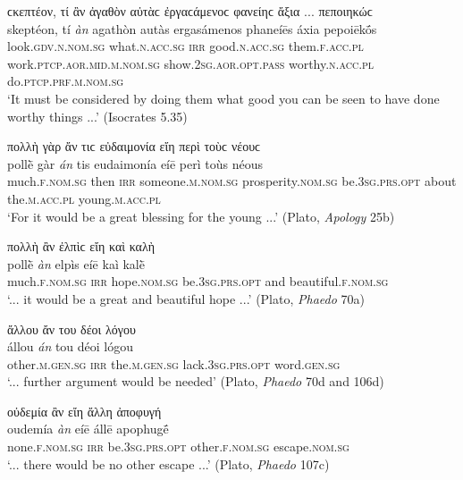 \begin{exe}
\ex ϲκεπτέον, τί ἂν ἀγαθὸν αὐτὰϲ ἐργαϲάμενοϲ φανείηϲ ἄξια ... πεποιηκώϲ\\
\gll skeptéon, tí \emph{àn} agathòn autàs ergasámenos phaneíēs áxia pepoiēkṓs\\
look.\textsc{gdv.n.nom.sg} what.\textsc{n.acc.sg} \textsc{irr} good.\textsc{n.acc.sg} them.\textsc{f.acc.pl} work.\textsc{ptcp.aor.mid.m.nom.sg} show.\textsc{2sg.aor.opt.pass} worthy.\textsc{n.acc.pl} do.\textsc{ptcp.prf.m.nom.sg}\\
\trans `It must be considered by doing them what good you can be seen to have done worthy things ...' (Isocrates 5.35)
\label{wordgroup21}
\end{exe}

\begin{exe}
\ex πολλὴ γὰρ ἄν τιϲ εὐδαιμονία εἴη περὶ τοὺϲ νέουϲ\\
\gll pollḕ gàr \emph{án} tis eudaimonía eíē perì toùs néous\\
much.\textsc{f.nom.sg} then \textsc{irr} someone.\textsc{m.nom.sg} prosperity.\textsc{nom.sg} be.\textsc{3sg.prs.opt} about the.\textsc{m.acc.pl} young.\textsc{m.acc.pl}\\
\trans `For it would be a great blessing for the young ...' (Plato, \textit{Apology} 25b)
\label{wordgroup22}
\end{exe}

\begin{exe}
\ex πολλὴ ἂν ἐλπὶϲ εἴη καὶ καλὴ\\
\gll pollḕ \emph{àn} elpìs eíē kaì kalḕ\\
much.\textsc{f.nom.sg} \textsc{irr} hope.\textsc{nom.sg} be.\textsc{3sg.prs.opt} and beautiful.\textsc{f.nom.sg}\\
\trans `... it would be a great and beautiful hope ...' (Plato, \textit{Phaedo} 70a)
\label{wordgroup23}
\end{exe}

\begin{exe}
\ex ἄλλου ἄν του δέοι λόγου\\
\gll állou \emph{án} tou déoi lógou\\
other.\textsc{m.gen.sg} \textsc{irr} the.\textsc{m.gen.sg} lack.\textsc{3sg.prs.opt} word.\textsc{gen.sg}\\
\trans `... further argument would be needed' (Plato, \textit{Phaedo} 70d and 106d)
\label{wordgroup24}
\end{exe}

\begin{exe}
\ex οὐδεμία ἂν εἴη ἄλλη ἀποφυγή\\
\gll oudemía \emph{àn} eíē állē apophugḗ\\
none.\textsc{f.nom.sg} \textsc{irr} be.\textsc{3sg.prs.opt} other.\textsc{f.nom.sg} escape.\textsc{nom.sg}\\
\trans `... there would be no other escape ...' (Plato, \textit{Phaedo} 107c)
\label{wordgroup25}
\end{exe}

